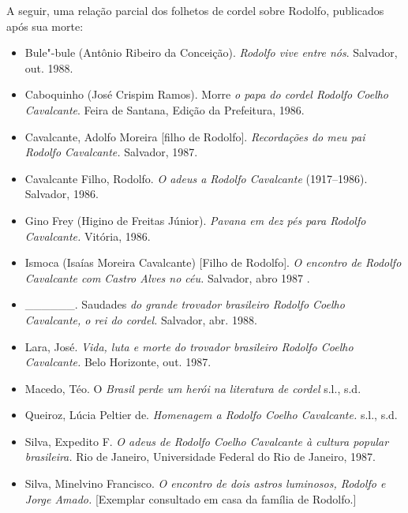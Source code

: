 A seguir, uma relação parcial dos folhetos de cordel sobre Rodolfo,
publicados após sua morte:

\begin{itemize}

\item
Bule"-bule (Antônio Ribeiro da Conceição). \textit{Rodolfo vive entre
nós}. Salvador, out. 1988.

\item
Caboquinho (José Crispim Ramos). Morre \textit{o papa do cordel Rodolfo
Coelho Cavalcante}. Feira de Santana, Edição da Prefeitura, 1986.
\item
Cavalcante, Adolfo Moreira [filho de Rodolfo]. \textit{Recordações do
meu pai Rodolfo Cavalcante.} Salvador, 1987.
\item
Cavalcante Filho, Rodolfo. \textit{O adeus a Rodolfo Cavalcante}
(1917--1986). Salvador, 1986.
\item

Gino Frey (Higino de Freitas Júnior). \textit{Pavana em dez pés para
Rodolfo Cavalcante.} Vitória, 1986.
\item

Ismoca (Isaías Moreira Cavalcante) [Filho de Rodolfo]. \textit{O
encontro de Rodolfo Cavalcante com Castro Alves no céu.} Salvador, abro
1987 .
\item

\_\_\_\_\_\_. Saudades \textit{do grande trovador brasileiro Rodolfo
Coelho Cavalcante, o rei do cordel.} Salvador, abr. 1988.
\item

Lara, José. \textit{Vida, luta e morte do trovador brasileiro Rodolfo
Coelho Cavalcante.} Belo Horizonte, out. 1987.
\item

Macedo, Téo. O \textit{Brasil perde um herói na literatura de cordel}
s.l., s.d.
\item

Queiroz, Lúcia Peltier de. \textit{Homenagem a Rodolfo Coelho
Cavalcante.} s.l., s.d.
\item
Silva, Expedito F. \textit{O adeus de Rodolfo Coelho Cavalcante à
cultura popular brasileira.} Rio de Janeiro, Universidade Federal do
Rio de Janeiro, 1987.
\item

Silva, Minelvino Francisco. \textit{O encontro de dois astros luminosos,
Rodolfo e Jorge Amado.} [Exemplar consultado em casa da família de
Rodolfo.]

\end{itemize}

